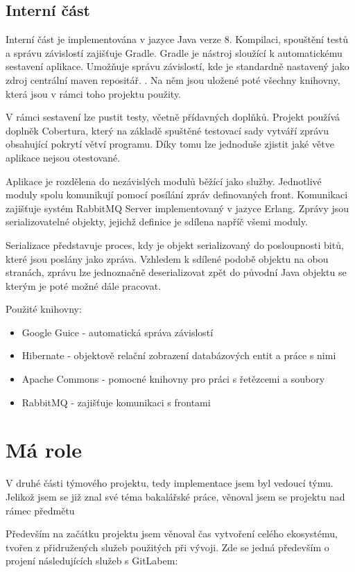 \documentclass[thesis=B,czech]{FITthesis}[2012/06/26]
\begin{document}
\subsection{Interní část}
Interní část je implementována v jazyce Java verze 8. Kompilaci, spouštění testů a správu závislostí zajišťuje Gradle\cite{gradle}.
Gradle je nástroj sloužící k automatickému sestavení aplikace. Umožňuje správu závislostí, kde je standardně nastavený jako zdroj
centrální maven repositář. \cite{mavenRepo}. Na něm jsou uložené poté všechny knihovny, která jsou v rámci toho projektu použity.
\par
V rámci sestavení lze pustit testy, včetně přídavných doplňků. Projekt používá
doplněk Cobertura\cite{cobertura}, který na základě spuštěné testovací sady vytváří zprávu obsahující pokrytí větví programu.
Díky tomu lze jednoduše zjistit jaké větve aplikace nejsou otestované.
\par
Aplikace je rozdělena do nezávislých modulů běžící jako služby. Jednotlivé moduly spolu komunikují
pomocí posílání zpráv definovaných front. Komunikaci zajišťuje systém RabbitMQ Server implementovaný v jazyce Erlang. Zprávy jsou serializovatelné objekty, jejichž definice je sdílena napříč všemi moduly.
\par
Serializace představuje proces, kdy je objekt serializovaný do posloupnosti bitů, které jsou poslány jako zpráva. 
Vzhledem k sdílené podobě objektu na obou stranách, zprávu lze jednoznačně deserializovat zpět do původní Java objektu se kterým
je poté možné dále pracovat.\cite{serialization}

\par
Použité knihovny:
\begin{itemize}
\item Google Guice - automatická správa závislostí \cite{guice}
\item Hibernate - objektově relační zobrazení databázových entit a práce s nimi \cite{hibernate}
\item Apache Commons - pomocné knihovny pro práci s řetězcemi a soubory \cite{commons}
\item RabbitMQ - zajišťuje komunikaci s frontami \cite{rabbitMQ}
\end{itemize}

\section{Má role}
V druhé části týmového projektu, tedy implementace jsem byl vedoucí týmu. Jelikož jsem se již znal své téma bakalářské práce, 
věnoval jsem se projektu nad rámec předmětu
\par
Především na začátku projektu jsem věnoval čas vytvoření celého ekosystému, tvořen z přidružených služeb použitých při vývoji.
Zde se jedná především o projení následujících služeb s GitLabem:
\end{document}
